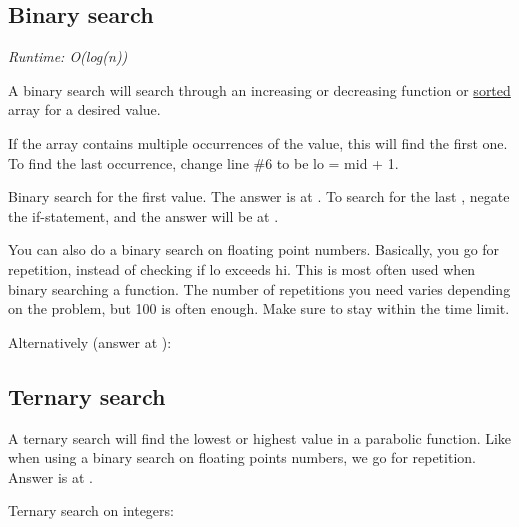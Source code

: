 
\subsection*{Binary search}

\textit{Runtime: O(log(n))}

A binary search will search through an increasing or decreasing function or \underline{sorted} array for a desired value.



If the array contains multiple occurrences of the value, this will find the first one. To find the last occurrence, change line \#6 to be lo = mid + 1.



Binary search for the first  value. The answer is at . To search for the last , negate the if-statement, and the answer will be at . 



You can also do a binary search on floating point numbers. Basically, you go for repetition, instead of checking if lo exceeds hi. This is most often used when binary searching a function. The number of repetitions you need varies depending on the problem, but 100 is often enough. Make sure to stay within the time limit.



Alternatively (answer at ):



\subsection*{Ternary search}

A ternary search will find the lowest or highest value in a parabolic function. Like when using a binary search on floating points numbers, we go for repetition. Answer is at .



Ternary search on integers:



\newpage

